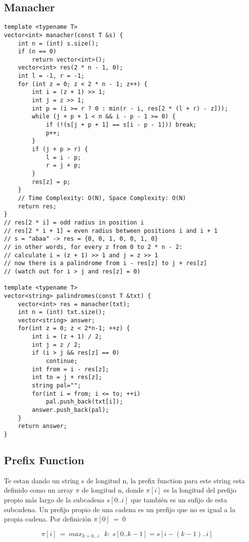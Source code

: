 \documentclass[10pt,letterpaper,twocolumn,twosided]{article}
\begin{document}
\subsection{Manacher}
\begin{lstlisting}
template <typename T>
vector<int> manacher(const T &s) {
    int n = (int) s.size();
    if (n == 0)
        return vector<int>();
    vector<int> res(2 * n - 1, 0);
    int l = -1, r = -1;
    for (int z = 0; z < 2 * n - 1; z++) {
        int i = (z + 1) >> 1;
        int j = z >> 1;
        int p = (i >= r ? 0 : min(r - i, res[2 * (l + r) - z]));
        while (j + p + 1 < n && i - p - 1 >= 0) {
            if (!(s[j + p + 1] == s[i - p - 1])) break;
            p++;
        }
        if (j + p > r) {
            l = i - p;
            r = j + p;
        }
        res[z] = p;
    }
    // Time Complexity: O(N), Space Complexity: O(N)
    return res;
}
// res[2 * i] = odd radius in position i
// res[2 * i + 1] = even radius between positions i and i + 1
// s = "abaa" -> res = {0, 0, 1, 0, 0, 1, 0}
// in other words, for every z from 0 to 2 * n - 2:
// calculate i = (z + 1) >> 1 and j = z >> 1
// now there is a palindrome from i - res[z] to j + res[z]
// (watch out for i > j and res[z] = 0)

template <typename T>
vector<string> palindromes(const T &txt) {
    vector<int> res = manacher(txt);
    int n = (int) txt.size();
    vector<string> answer;
    for(int z = 0; z < 2*n-1; ++z) {
        int i = (z + 1) / 2;
        int j = z / 2;
        if (i > j && res[z] == 0)
            continue;
        int from = i - res[z];
        int to = j + res[z];
        string pal="";
        for(int i = from; i <= to; ++i)
            pal.push_back(txt[i]);
        answer.push_back(pal);
    }
    return answer;
}
\end{lstlisting}

\subsection{Prefix Function}

Te estan dando un string s de longitud n, la prefix function para este string esta definido como un array $\pi$ de longitud n, donde $\pi[i]$ es la longitud del prefijo propio más largo de la subcadena $s[0..i]$ que también es un sufijo de esta subcadena. Un prefijo propio de una cadena es un prefijo que no es igual a la propia cadena. Por definición $\pi[0]\:=\:0$

$$\pi \left[i\right]\:=\:max_{k=0...i}\:\:\:k:\:s\left[0..k-1\right]=s\left[i-\left(k-1\right)..i\right]$$
\end{document}
